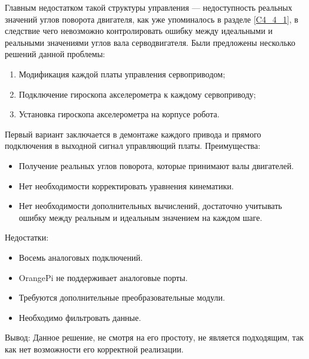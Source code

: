 Главным недостатком такой структуры управления --- недоступность реальных значений углов поворота двигателя, как уже упоминалось в разделе \ref{C4_4_1}, в следствие чего невозможно контролировать ошибку между идеальными и реальными значениями углов вала серводвигателя. Были предложены несколько решений данной проблемы:
\begin{enumerate}
	\item Модификация каждой платы управления сервоприводом;
	\item Подключение гироскопа акселерометра к каждому сервоприводу;
	\item Установка гироскопа акселерометра на корпусе робота.
\end{enumerate}
Первый вариант заключается в демонтаже каждого привода и прямого подключения в выходной сигнал управляющий платы.\newline 
Преимущества:
\begin{itemize}
	\item Получение реальных углов поворота, которые принимают валы двигателей.
	\item Нет необходимости корректировать уравнения кинематики.
	\item Нет необходимости дополнительных вычислений, достаточно учитывать ошибку между реальным и идеальным значением на каждом шаге.
\end{itemize}
Недостатки:
\begin{itemize}
	\item Восемь аналоговых подключений.
	\item OrangePi не поддерживает аналоговые порты.
	\item Требуются дополнительные преобразовательные модули.
	\item Необходимо фильтровать данные.
\end{itemize}
Вывод:
Данное решение, не смотря на его простоту, не является подходящим, так как нет возможности его корректной реализации.
\newline


